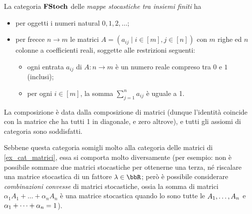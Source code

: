 \begin{example}\label{cat_stocazziche}
 La categoria \(\mathbf{FStoch}\) delle \emph{mappe stocastiche tra insiemi finiti} ha
 \begin{itemize}
  \item per oggetti i numeri natural \(0,1,2,\dots\);
  \item per frecce \(n\to m\) le matrici \(A=(a_{ij}\mid i\in [m], j\in[n])\) con \(m\) righe ed \(n\) colonne a coefficienti reali, soggette alle restrizioni seguenti:
        \begin{itemize}
         \item ogni entrata \(a_{ij}\) di \(A \colon n\to m\) è un numero reale compreso tra \(0\) e \(1\) (inclusi);
         \item per ogni \(i\in[m]\), la somma \(\sum_{j=1}^n a_{ij}\) è uguale a 1.
        \end{itemize}
 \end{itemize}
 La composizione è data dalla composizione di matrici (dunque l'identità coincide con la matrice che ha tutti 1 in diagonale, e zero altrove), e tutti gli assiomi di categoria sono soddisfatti.

 Sebbene questa categoria somigli molto alla categoria delle matrici di \ref{ex_cat_matrici}, essa si comporta molto diversamente (per esempio: non è possibile sommare due matrici stocastiche per ottenerne una terza, né riscalare una matrice stocastica di un fattore \(\lambda\in\bbR\); però è possibile considerare \emph{combinazioni convesse} di matrici stocastiche, ossia la somma di matrici \(\alpha_1 A_1+\dots + \alpha_n A_n\) è una matrice stocastica quando lo sono tutte le \({\tup An,}\) e \(\tup\alpha n+ = 1\)).
\end{example}

